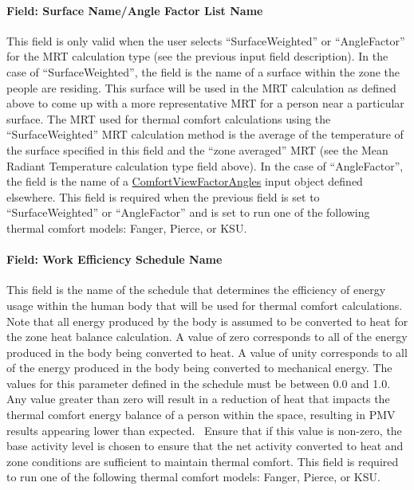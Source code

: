 \paragraph{Field: Surface Name/Angle Factor List Name}\label{field-surface-nameangle-factor-list-name}

This field is only valid when the user selects ``SurfaceWeighted'' or ``AngleFactor'' for the MRT calculation type (see the previous input field description). In the case of ``SurfaceWeighted'', the field is the name of a surface within the zone the people are residing. This surface will be used in the MRT calculation as defined above to come up with a more representative MRT for a person near a particular surface. The MRT used for thermal comfort calculations using the ``SurfaceWeighted'' MRT calculation method is the average of the temperature of the surface specified in this field and the ``zone averaged'' MRT (see the Mean Radiant Temperature calculation type field above). In the case of ``AngleFactor'', the field is the name of a \hyperref[comfortviewfactorangles]{ComfortViewFactorAngles} input object defined elsewhere. This field is required when the previous field is set to ``SurfaceWeighted'' or ``AngleFactor'' and is set to run one of the following thermal comfort models: Fanger, Pierce, or KSU.

\paragraph{Field: Work Efficiency Schedule Name}\label{field-work-efficiency-schedule-name}

This field is the name of the schedule that determines the efficiency of energy usage within the human body that will be used for thermal comfort calculations. Note that all energy produced by the body is assumed to be converted to heat for the zone heat balance calculation. A value of zero corresponds to all of the energy produced in the body being converted to heat. A value of unity corresponds to all of the energy produced in the body being converted to mechanical energy. The values for this parameter defined in the schedule must be between 0.0 and 1.0. Any value greater than zero will result in a reduction of heat that impacts the thermal comfort energy balance of a person within the space, resulting in PMV results appearing lower than expected.~ Ensure that if this value is non-zero, the base activity level is chosen to ensure that the net activity converted to heat and zone conditions are sufficient to maintain thermal comfort. This field is required to run one of the following thermal comfort models: Fanger, Pierce, or KSU.

